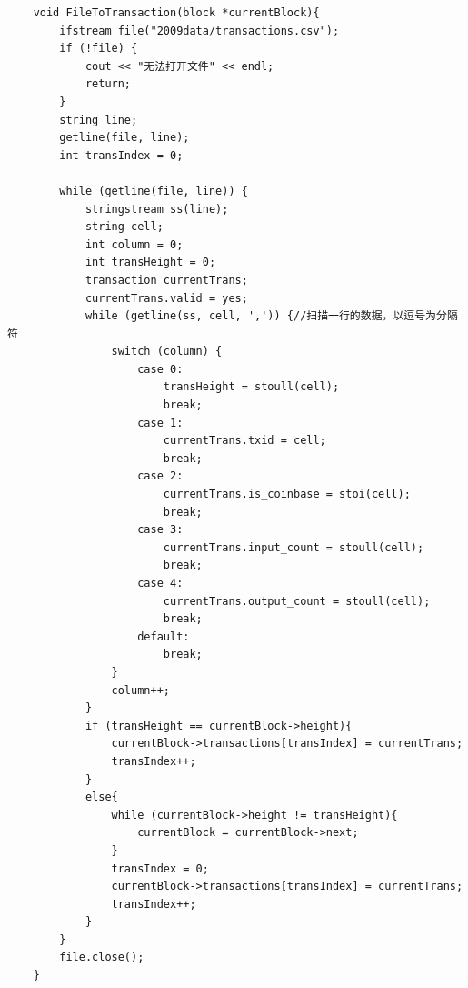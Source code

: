 \documentclass[10pt,a4paper]{article}
\begin{document}
\begin{verbatim}
    void FileToTransaction(block *currentBlock){
        ifstream file("2009data/transactions.csv");
        if (!file) {
            cout << "无法打开文件" << endl;
            return;
        }
        string line;
        getline(file, line);
        int transIndex = 0;
    
        while (getline(file, line)) {
            stringstream ss(line);
            string cell;
            int column = 0;
            int transHeight = 0;
            transaction currentTrans;
            currentTrans.valid = yes;
            while (getline(ss, cell, ',')) {//扫描一行的数据，以逗号为分隔符
                switch (column) {
                    case 0:
                        transHeight = stoull(cell);
                        break;
                    case 1:
                        currentTrans.txid = cell;
                        break;
                    case 2:
                        currentTrans.is_coinbase = stoi(cell);
                        break;
                    case 3:
                        currentTrans.input_count = stoull(cell);
                        break;
                    case 4:
                        currentTrans.output_count = stoull(cell);
                        break;
                    default:
                        break;
                }
                column++;
            }
            if (transHeight == currentBlock->height){
                currentBlock->transactions[transIndex] = currentTrans;
                transIndex++;
            }
            else{
                while (currentBlock->height != transHeight){
                    currentBlock = currentBlock->next;
                }
                transIndex = 0;
                currentBlock->transactions[transIndex] = currentTrans;
                transIndex++;
            }
        }
        file.close();
    }
    

\end{verbatim}
\end{document}
